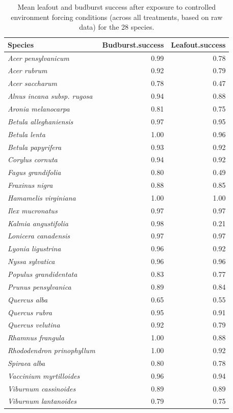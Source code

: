 \documentclass{article}
\begin{document}
\begin{table}[ht]
\centering
\caption{Mean leafout and budburst success after exposure to controlled environment forcing conditions (across all treatments, based on raw data) for the 28 species.} 
\begin{tabular}{lrr}
  \hline
Species & Budburst.success & Leafout.success \\ 
  \hline
\textit{Acer pensylvanicum} & 0.99 & 0.78 \\ 
  \textit{Acer rubrum} & 0.92 & 0.79 \\ 
  \textit{Acer saccharum} & 0.78 & 0.47 \\ 
  \textit{Alnus incana subsp. rugosa} & 0.94 & 0.88 \\ 
  \textit{Aronia melanocarpa} & 0.81 & 0.75 \\ 
  \textit{Betula alleghaniensis} & 0.97 & 0.95 \\ 
  \textit{Betula lenta} & 1.00 & 0.96 \\ 
  \textit{Betula papyrifera} & 0.93 & 0.92 \\ 
  \textit{Corylus cornuta} & 0.94 & 0.92 \\ 
  \textit{Fagus grandifolia} & 0.80 & 0.49 \\ 
  \textit{Fraxinus nigra} & 0.88 & 0.85 \\ 
  \textit{Hamamelis virginiana} & 1.00 & 1.00 \\ 
  \textit{Ilex mucronatus} & 0.97 & 0.97 \\ 
  \textit{Kalmia angustifolia} & 0.98 & 0.21 \\ 
  \textit{Lonicera canadensis} & 0.97 & 0.97 \\ 
  \textit{Lyonia ligustrina} & 0.96 & 0.92 \\ 
  \textit{Nyssa sylvatica} & 0.96 & 0.96 \\ 
  \textit{Populus grandidentata} & 0.83 & 0.77 \\ 
  \textit{Prunus pensylvanica} & 0.89 & 0.84 \\ 
  \textit{Quercus alba} & 0.65 & 0.55 \\ 
  \textit{Quercus rubra} & 0.95 & 0.91 \\ 
  \textit{Quercus velutina} & 0.92 & 0.79 \\ 
  \textit{Rhamnus frangula} & 1.00 & 0.88 \\ 
  \textit{Rhododendron prinophyllum} & 1.00 & 0.92 \\ 
  \textit{Spiraea alba} & 0.80 & 0.78 \\ 
  \textit{Vaccinium myrtilloides} & 0.96 & 0.94 \\ 
  \textit{Viburnum cassinoides} & 0.89 & 0.89 \\ 
  \textit{Viburnum lantanoides} & 0.79 & 0.75 \\ 
   \hline
\end{tabular}
\end{table}
\end{document}

